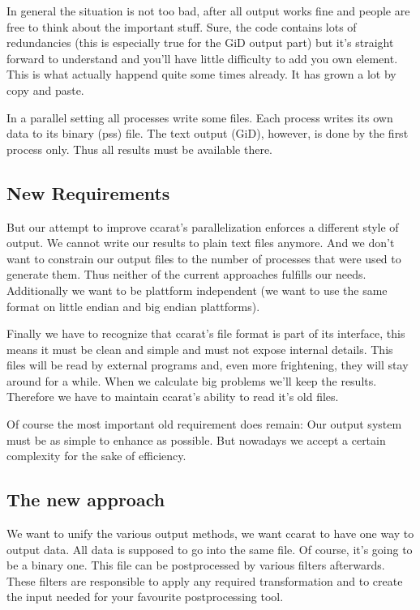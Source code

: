 In general the situation is not too bad, after all output works fine
and people are free to think about the important stuff. Sure, the
code contains lots of redundancies (this is especially true for the
GiD output part) but it's straight forward to understand and you'll
have little difficulty to add you own element. This is what actually
happend quite some times already. It has grown a lot by copy and paste.

In a parallel setting all processes write some files. Each process
writes its own data to its binary (pss) file. The text output (GiD),
however, is done by the first process only. Thus all results must
be available there.


\subsection{New Requirements}

But our attempt to improve ccarat's parallelization enforces a different
style of output. We cannot write our results to plain text files anymore.
And we don't want to constrain our output files to the number of processes
that were used to generate them. Thus neither of the current approaches
fulfills our needs. Additionally we want to be plattform independent
(we want to use the same format on little endian and big endian plattforms).

Finally we have to recognize that ccarat's file format is part of
its interface, this means it must be clean and simple and must not
expose internal details. This files will be read by external programs
and, even more frightening, they will stay around for a while. When
we calculate big problems we'll keep the results. Therefore we have
to maintain ccarat's ability to read it's old files.

Of course the most important old requirement does remain: Our output
system must be as simple to enhance as possible. But nowadays we accept
a certain complexity for the sake of efficiency.


\subsection{The new approach}

We want to unify the various output methods, we want ccarat to have
one way to output data. All data is supposed to go into the same file.
Of course, it's going to be a binary one. This file can be postprocessed
by various filters afterwards. These filters are responsible to apply
any required transformation and to create the input needed for your
favourite postprocessing tool.

